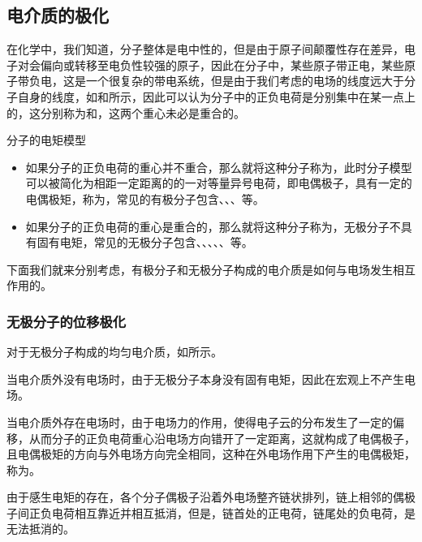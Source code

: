 \subsection{电介质的极化}
在化学中，我们知道，分子整体是电中性的，但是由于原子间颠覆性存在差异，电子对会偏向或转移至电负性较强的原子，因此在分子中，某些原子带正电，某些原子带负电，这是一个很复杂的带电系统，但是由于我们考虑的电场的线度远大于分子自身的线度，如和所示，因此可以认为分子中的正负电荷是分别集中在某一点上的，这分别称为和，这两个重心未必是重合的。
\begin{Figure}{分子的电矩模型}
    \qquad\qquad
\end{Figure}
\begin{itemize}
    \item 如果分子的正负电荷的重心并不重合，那么就将这种分子称为，此时分子模型可以被简化为相距一定距离的的一对等量异号电荷，即电偶极子，具有一定的电偶极矩，称为，常见的有极分子包含、、、等。
    \item 如果分子的正负电荷的重心是重合的，那么就将这种分子称为，无极分子不具有固有电矩，常见的无极分子包含、、、、、等。
\end{itemize}
下面我们就来分别考虑，有极分子和无极分子构成的电介质是如何与电场发生相互作用的。

\subsubsection{无极分子的位移极化}
对于无极分子构成的均匀电介质，如所示。

当电介质外没有电场时，由于无极分子本身没有固有电矩，因此在宏观上不产生电场。

当电介质外存在电场时，由于电场力的作用，使得电子云的分布发生了一定的偏移，从而分子的正负电荷重心沿电场方向错开了一定距离，这就构成了电偶极子，且电偶极矩的方向与外电场方向完全相同，这种在外电场作用下产生的电偶极矩，称为。

由于感生电矩的存在，各个分子偶极子沿着外电场整齐链状排列，链上相邻的偶极子间正负电荷相互靠近并相互抵消，但是，链首处的正电荷，链尾处的负电荷，是无法抵消的。

